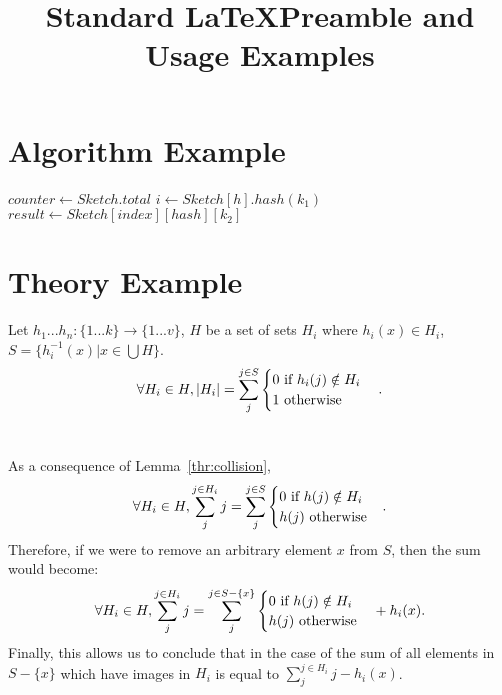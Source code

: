 


	\title{Standard \LaTeX Preamble and Usage Examples}
	\section{Algorithm Example}
		\begin{algorithmic}	[1]
			\LState $counter\gets Sketch.total$
			\LState $i\gets Sketch[h].hash(k_1)$
			\EndIf
			\EndFor
			\LState $result\gets Sketch[index][hash][k_2]$
		\end{algorithmic}
	\section{Theory Example}
		\begin{lemma}
			\label{thr:collision}
			Let $h_1...h_n : \{1...k\} \to \{1...v\}$, $H$ be a set of sets $H_i$ where $h_i(x) \in H_i$, $S = \{h_i^{-1}(x) | x \in \bigcup H\}$.\\
			\begin{displaymath}
			\forall H_i \in H, |H_i| = \sum_{j}^{j \in S} \begin{cases}0 \textnormal{ if } h_i(j) \notin H_i\\
			1 \textnormal{ otherwise}\end{cases}.
			\end{displaymath}
			\\
		\end{lemma}
		
		\begin{corollary}
			\label{cor:collision}
			As a consequence of Lemma~\ref{thr:collision},
			\begin{displaymath}
			\forall H_i \in H, \sum_{j}^{j \in H_i}j = \sum_{j}^{j \in S}{\begin{cases}0 \textnormal{ if } h(j) \notin H_i\\
				h(j) \textnormal{ otherwise}\end{cases}}.
			\end{displaymath}
			Therefore, if we were to remove an arbitrary element $x$ from $S$, then the sum would become:
			\begin{displaymath}
			\forall H_i \in H, \sum_{j}^{j \in H_i}j = \sum_{j}^{j \in S-\{x\}}{\begin{cases}0 \textnormal{ if } h(j) \notin H_i\\
				h(j) \textnormal{ otherwise}\end{cases}} + h_i(x).
			\end{displaymath}
			Finally, this allows us to conclude that in the case of the sum of all elements in $S-\{x\}$ which have images in $H_i$ is equal to $\sum_{j}^{j \in H_i}{j - h_i(x)}$.
		\end{corollary}
